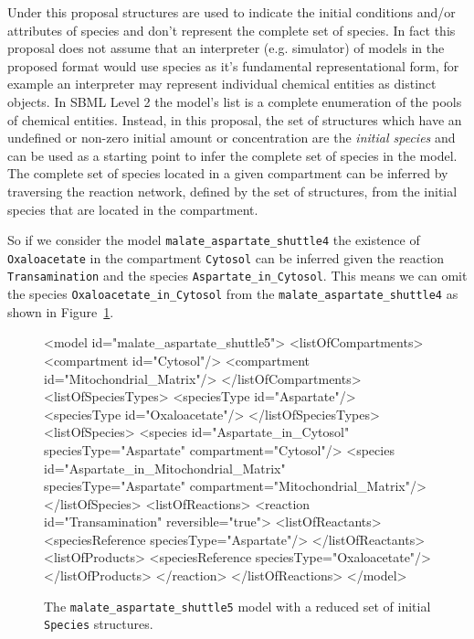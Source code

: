 \documentclass{cekarticle}
\begin{document}
Under this proposal  structures are used to indicate the initial conditions
and/or attributes of species and don't represent the complete
set of species.  In fact this proposal does not assume that an interpreter (e.g.
simulator) of models in the proposed format would use species as it's fundamental representational form,
for example an interpreter may represent individual chemical entities as distinct objects.
In SBML Level 2 the model's  list is a complete enumeration of the
pools of chemical entities.  Instead, in this proposal, the set of  structures
which have an undefined or non-zero initial amount or concentration are the \emph{initial species}
and can be used as a starting point to infer the complete set of species in the model.
The complete set of species located in a given compartment can be inferred by traversing the reaction
network, defined by the set of  structures, from the initial species that are located
in the compartment.

So if we consider the model \texttt{malate\_aspartate\_shuttle4} the existence of
\texttt{Oxaloacetate} in the compartment \texttt{Cytosol} can be inferred given the reaction
\texttt{Transamination} and the species \texttt{Aspartate\_in\_Cytosol}.  This means we can omit
the species \texttt{Oxaloacetate\_in\_Cytosol} from the \texttt{malate\_aspartate\_shuttle4} as shown
in Figure~\ref{fig:malate_aspartate_shuttle5-xml}.

\begin{figure}[h]
\begin{example}
<model id="malate_aspartate_shuttle5">
    <listOfCompartments>
        <compartment id="Cytosol"/>
        <compartment id="Mitochondrial_Matrix"/>
    </listOfCompartments>
    <listOfSpeciesTypes>
        <speciesType id="Aspartate"/>
        <speciesType id="Oxaloacetate"/>
    </listOfSpeciesTypes>
    <listOfSpecies>
        <species
            id="Aspartate_in_Cytosol"
            speciesType="Aspartate"
            compartment="Cytosol"/>
        <species
            id="Aspartate_in_Mitochondrial_Matrix"
            speciesType="Aspartate"
            compartment="Mitochondrial_Matrix"/>
    </listOfSpecies>
    <listOfReactions>
        <reaction id="Transamination" reversible="true">
            <listOfReactants>
                <speciesReference speciesType="Aspartate"/>
            </listOfReactants>
            <listOfProducts>
                <speciesReference speciesType="Oxaloacetate"/>
            </listOfProducts>
        </reaction>
    </listOfReactions>
</model>
\end{example}
\caption{The \texttt{malate\_aspartate\_shuttle5} model with a reduced set of initial \texttt{Species}
structures.} 
\label{fig:malate_aspartate_shuttle5-xml}
\end{figure}
\end{document}
